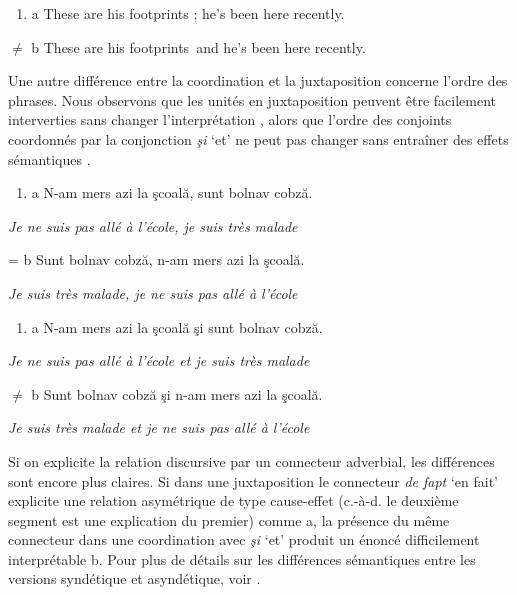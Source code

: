 \begin{enumerate}
\item \label{bkm:Ref272261210}a  These are his footprints ; he's been here recently.


\end{enumerate}
\textit{${\neq}$}  b  These are his footprints~and he's been here recently.

Une autre différence entre la coordination et la juxtaposition concerne l'ordre des phrases. Nous observons que les unités en juxtaposition peuvent être facilement interverties sans changer l'interprétation , alors que l'ordre des conjoints coordonnés par la conjonction \textit{şi} `et' ne peut pas changer sans entraîner des effets sémantiques .


\begin{enumerate}
\item \label{bkm:Ref273638437}a  N-am mers azi la şcoală, sunt bolnav cobză.


\end{enumerate}
{\itshape
  Je ne suis pas allé à l'école, je suis très malade}

=  b  Sunt bolnav cobză, n-am mers azi la şcoală.

    \textit{Je suis très malade, je ne suis pas allé à l'école}


\begin{enumerate}
\item \label{bkm:Ref273638457}a  N-am mers azi la şcoală şi sunt bolnav cobză.


\end{enumerate}
{\itshape
  Je ne suis pas allé à l'école et je suis très malade}

${\neq}$  b  Sunt bolnav cobză şi n-am mers azi la şcoală.

    \textit{Je suis très malade et je ne suis pas allé à l'école}

Si on explicite la relation discursive par un connecteur adverbial, les différences sont encore plus claires. Si dans une juxtaposition le connecteur \textit{de fapt} `en fait' explicite une relation asymétrique de type cause-effet (c.-à-d. le deuxième segment est une explication du premier) comme a, la présence du même connecteur dans une coordination avec \textit{şi} `et' produit un énoncé difficilement interprétable b. Pour plus de détails sur les différences sémantiques entre les versions syndétique et asyndétique, voir \citet{Winterstein2010}.


